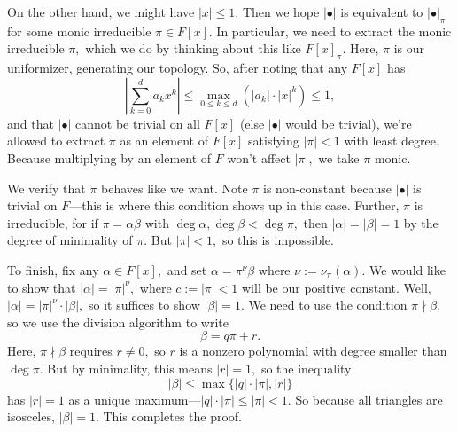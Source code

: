 On the other hand, we might have $|x|\le1.$ Then we hope $|\bullet|$ is equivalent to $|\bullet|_\pi$ for some monic irreducible $\pi\in F[x].$ In particular, we need to extract the monic irreducible $\pi,$ which we do by thinking about this like $F[x]_\pi.$ Here, $\pi$ is our uniformizer, generating our topology. So, after noting that any $F[x]$ has
\[\left|\sum_{k=0}^da_kx^k\right|\le\max_{0\le k\le d}\left(|a_k|\cdot|x|^k\right)\le1,\]
and that $|\bullet|$ cannot be trivial on all $F[x]$ (else $|\bullet|$ would be trivial), we're allowed to extract $\pi$ as an element of $F[x]$ satisfying $|\pi|<1$ with least degree. Because multiplying by an element of $F$ won't affect $|\pi|,$ we take $\pi$ monic.

We verify that $\pi$ behaves like we want. Note $\pi$ is non-constant because $|\bullet|$ is trivial on $F$---this is where this condition shows up in this case. Further, $\pi$ is irreducible, for if $\pi=\alpha\beta$ with $\deg\alpha,\deg\beta<\deg\pi,$ then $|\alpha|=|\beta|=1$ by the degree of minimality of $\pi.$ But $|\pi|<1,$ so this is impossible.

To finish, fix any $\alpha\in F[x],$ and set $\alpha=\pi^\nu\beta$ where $\nu:=\nu_\pi(\alpha).$ We would like to show that $|\alpha|=|\pi|^\nu,$ where $c:=|\pi|<1$ will be our positive constant. Well, $|\alpha|=|\pi|^\nu\cdot|\beta|,$ so it suffices to show $|\beta|=1.$ We need to use the condition $\pi\nmid\beta,$ so we use the division algorithm to write
\[\beta=q\pi+r.\]
Here, $\pi\nmid\beta$ requires $r\ne0,$ so $r$ is a nonzero polynomial with degree smaller than $\deg\pi.$ But by minimality, this means $|r|=1,$ so the inequality
\[|\beta|\le\max\{|q|\cdot|\pi|,|r|\}\]
has $|r|=1$ as a unique maximum---$|q|\cdot|\pi|\le|\pi|<1.$ So because all triangles are isosceles, $|\beta|=1.$ This completes the proof.